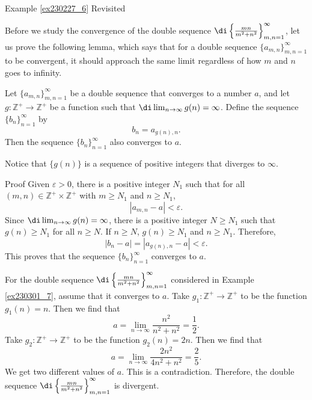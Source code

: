\begin{example}{\linkt Example \ref{ex230227_6} Revisited}
\begin{example}[label=ex230227_13]{}
\begin{example}{}
Before we study the convergence of the double sequence $\di\left\{\frac{mn}{m^2+n^2}\right\}_{m,n=1}^{\infty}$, let us prove the following lemma, which says that for a   double sequence $\{a_{m,n}\}_{m,n=1}^{\infty}$ to be convergent, it should approach the same limit regardless of how $m$ and $n$ goes to infinity.

\begin{lemma}{}
Let $\{a_{m,n}\}_{m,n=1}^{\infty}$ be a double sequence that converges to a number $a$, and let $g:\mathbb{Z}^+\to\mathbb{Z}^+$ be a function such that $\di\lim_{n\to\infty} g(n)=\infty$. Define the sequence $\{b_n\}_{n=1}^{\infty}$ by
\[b_n=a_{g(n), n}.\]
Then the sequence $\{b_n\}_{n=1}^{\infty}$ also converges to $a$.
\end{lemma}Notice that $\{g(n)\}$ is a sequence of positive integers that diverges to $\infty$.
\begin{myproof}{Proof}
Given $\varepsilon>0$, there is a positive integer $N_1$ such that for all $(m,n)\in\mathbb{Z}^+\times\mathbb{Z}^+$ with $m\geq N_1$ and $n\geq N_1$, 
\[|a_{m,n}-a|<\varepsilon.\]
Since $\di\lim_{n\to\infty} g(n)=\infty$, there is a positive integer $N\geq N_1$ such that $g(n)\geq N_1$ for all $n\geq N$. If $n\geq N$, $g(n)\geq N_1$ and $n\geq N_1$. Therefore,
\[|b_n-a|=|a_{g(n),n}-a|<\varepsilon.\]
This proves that the sequence $\{b_n\}_{n=1}^{\infty}$ converges to $a$.
\end{myproof}

\begin{example}{}
For the double sequence $\di\left\{\frac{mn}{m^2+n^2}\right\}_{m,n=1}^{\infty}$   considered in Example \ref{ex230301_7}, assume that it converges to  $a$. Take $g_1:\mathbb{Z}^+\to\mathbb{Z}^+$ to be the function $g_1(n)=n$. Then we find that
\[a=\lim_{n\to\infty}\frac{n^2}{n^2+n^2}=\frac{1}{2}.\]
Take $g_2:\mathbb{Z}^+\to\mathbb{Z}^+$ to be the function $g_2(n)=2n$. Then we find that
\[a=\lim_{n\to\infty}\frac{2n^2}{4n^2+n^2}=\frac{2}{5}.\] We get two different values of $a$. This is a contradiction. Therefore,   the double sequence $\di\left\{\frac{mn}{m^2+n^2}\right\}_{m,n=1}^{\infty}$  is divergent. 
\end{example}


\end{example}
\end{example}
\end{example}
